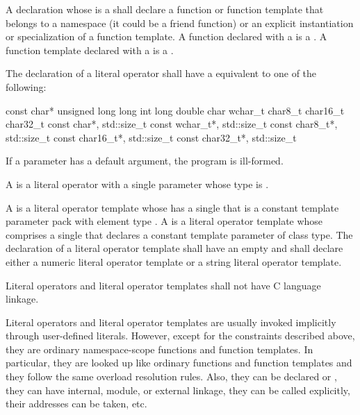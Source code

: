 \pnum
A declaration whose  is a
 shall declare a function or function template
that belongs to a namespace (it could be a friend function) or
an explicit instantiation or specialization of a function template.
A function declared with a  is a . A function template declared with a 
is a .

\pnum
The declaration of a literal operator shall have a
 equivalent to one of the following:

\begin{codeblock}
const char*
unsigned long long int
long double
char
wchar_t
char8_t
char16_t
char32_t
const char*, std::size_t
const wchar_t*, std::size_t
const char8_t*, std::size_t
const char16_t*, std::size_t
const char32_t*, std::size_t
\end{codeblock}

If a parameter has a default argument, the program is
ill-formed.

\pnum
A  is a literal operator with a single parameter
whose type is .

\pnum
A 
is a literal operator template whose 
has a single 
that is a constant template parameter pack
with element type .
A 
is a literal operator template whose 
comprises
a single  that declares a
constant template parameter of class type.
The declaration of a literal operator template
shall have an empty 
and shall declare either a numeric literal operator template
or a string literal operator template.

\pnum
Literal operators and literal operator templates shall not have C language linkage.

\pnum
\begin{note}
Literal operators and literal operator templates are usually invoked
implicitly through user-defined literals. However, except for
the constraints described above, they are ordinary namespace-scope functions and
function templates. In particular, they are looked up like ordinary functions
and function templates and they follow the same overload resolution rules. Also,
they can be declared  or ,
they can have internal, module, or external linkage,
they can be called explicitly, their addresses can be
taken, etc.
\end{note}

